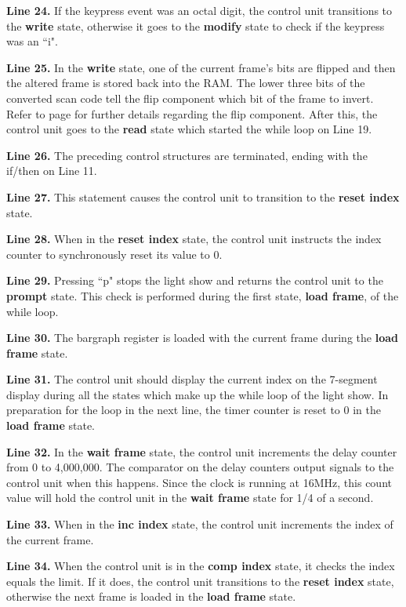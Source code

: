 \textbf{ Line 24.} If the keypress event was an octal digit, the control 
unit transitions to the \textbf{ write} state, otherwise it goes to the 
\textbf{ modify} state to check if the keypress was an ``i".

\textbf{ Line 25.}  In the \textbf{ write} state, one of the current frame's 
bits are flipped and then the altered frame is stored back into the 
RAM.  The lower three bits of the converted scan code tell the flip 
component which bit of the frame to invert.  Refer to 
page \pageref{page:flipbox} for further details regarding the flip 
component.  After this, the control unit goes to the \textbf{ read} state 
which started the while loop on Line 19.

\textbf{ Line 26.} The preceding control structures are terminated, ending with the if/then on Line 11.

\textbf{ Line 27.} This statement causes the control unit to transition to the 
\textbf{ reset index} state.

\textbf{ Line 28.} When in the \textbf{ reset index} state, the control unit instructs the index 
counter to synchronously reset its value to 0.

\textbf{ Line 29.} Pressing ``p" stops the light show and returns the control unit to the 
\textbf{ prompt} state.  This check is performed during the first state, \textbf{ load frame}, 
of the while loop.

\textbf{ Line 30.} The bargraph register is loaded with the current frame during the 
\textbf{ load frame} state.

\textbf{ Line 31.} The control unit should display the current index on the 7-segment display 
during all the states which make up the while loop of the light show.  In preparation for 
the loop in the next line, the timer counter is reset to 0 in the \textbf{ load frame}
 state.

\textbf{ Line 32.} In the \textbf{ wait frame} state, the control unit increments the 
delay counter from 0 to 4,000,000.  The comparator on the delay counters output 
signals to the control unit when this happens.  Since the clock is running at 
16MHz, this count value will hold the control unit in the \textbf{ wait frame} state
for 1/4 of a second.

\textbf{ Line 33.}  When in the \textbf{ inc index} state, the control unit increments 
the index of the current frame.

\textbf{ Line 34.} When the control unit is in the \textbf{ comp index} state, it checks 
the index equals the limit.  If it does, the control unit transitions to 
the \textbf{ reset index} state, otherwise the next frame is loaded in the 
\textbf{ load frame} state.

